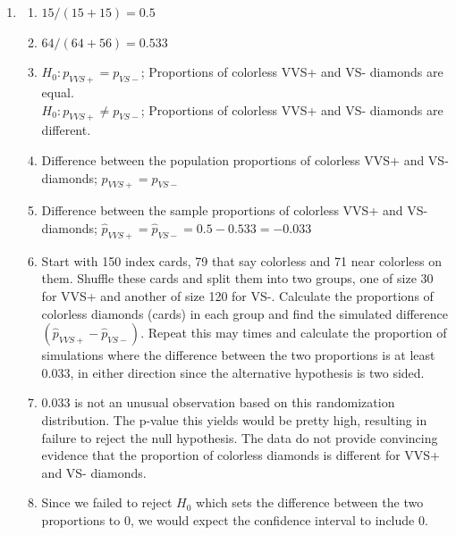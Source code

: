 \documentclass[11pt]{article}
\begin{document}
\begin{enumerate}
\item 
\begin{enumerate}
\item $15 / (15 + 15) = 0.5$
\item $64 / (64 + 56) = 0.533$
\item $H_0: p_{VVS+} = p_{VS-}$; Proportions of colorless VVS+ and VS- diamonds are equal. \\
$H_0: p_{VVS+} \ne p_{VS-}$; Proportions of colorless VVS+ and VS- diamonds are different.
\item Difference between the population proportions of colorless VVS+ and VS- diamonds;  $p_{VVS+} = p_{VS-}$
\item Difference between the sample proportions of colorless VVS+ and VS- diamonds;  $\hat{p}_{VVS+} = \hat{p}_{VS-} = 0.5 - 0.533 = -0.033$
\item Start with 150 index cards, 79 that say colorless and 71 near colorless on them. Shuffle these cards and split them into two groups, one of size 30 for VVS+ and another of size 120 for VS-. Calculate the proportions of colorless diamonds (cards) in each group and find the simulated difference $(\hat{p}_{VVS+} - \hat{p}_{VS-})$. Repeat this may times and calculate the proportion of simulations where the difference between the two proportions is at least 0.033, in either direction since the alternative hypothesis is two sided. 
\item 0.033 is not an unusual observation based on this randomization distribution. The p-value this yields would be pretty high, resulting in failure to reject the null hypothesis. The data do not provide convincing evidence that the proportion of colorless diamonds is different for VVS+ and VS- diamonds.
\item Since we failed to reject $H_0$ which sets the difference between the two proportions to 0, we would expect the confidence interval to include 0.

\end{enumerate}

\end{enumerate}

%
\end{document}
